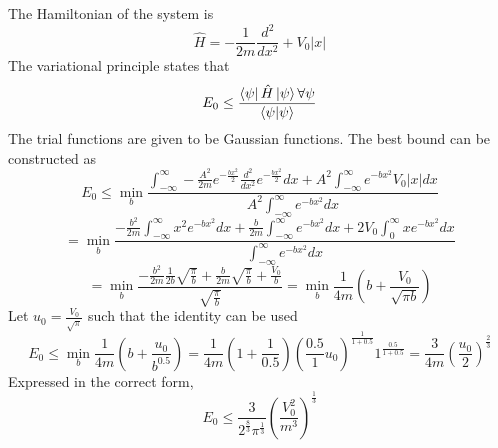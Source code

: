 \begin{sol}
The Hamiltonian of the system is 
\begin{equation}
	\hat H=-\frac{1}{2m}\frac{d^2}{dx^2}+V_0|x|
\end{equation}
The variational principle states that
\begin{equation}
	E_0\leq\frac{\bra\psi\hat H\ket\psi\forall\psi}{\braket{\psi}{\psi}}
\end{equation}
The trial functions are given to be Gaussian functions. The best bound can be constructed as
\begin{equation}
	E_0\leq\min_{b}\frac{\int_{-\infty}^\infty -\frac{A^2}{2m}e^{-\frac{bx^2}{2}}\frac{d^2}{dx^2}e^{-\frac{bx^2}{2}}dx+A^2\int_{-\infty}^\infty e^{-bx^2}V_0|x|dx}{A^2\int_{-\infty}^\infty e^{-bx^2}dx}
\end{equation}
\begin{equation}
	=\min_b\frac{-\frac{b^2}{2m}\int_{-\infty}^\infty x^2e^{-bx^2}dx+\frac{b}{2m}\int_{-\infty}^\infty e^{-bx^2}dx+2V_0\int_0^\infty xe^{-bx^2}dx}{\int_{-\infty}^\infty e^{-bx^2}dx}
\end{equation}
\begin{equation}
	=\min_b\frac{-\frac{b^2}{2m}\frac{1}{2b}\sqrt{\frac{\pi}{b}}+\frac{b}{2m}\sqrt{\frac{\pi}{b}}+\frac{V_0}{b}}{\sqrt{\frac{\pi}{b}}}=\min_b \frac{1}{4m}\left(b+\frac{V_0}{\sqrt{\pi b}}\right)
\end{equation}
Let $u_0=\frac{V_0}{\sqrt{\pi}}$ such that the identity can be used
\begin{equation}
	E_0\leq\min_b\frac{1}{4m}\left(b+\frac{u_0}{b^{0.5}}\right)=\frac{1}{4m}(1+\frac{1}{0.5})(\frac{0.5}{1}u_0)^{\frac{1}{1+0.5}}1^{\frac{0.5}{1+0.5}}=\frac{3}{4m}\left(\frac{u_0}{2}\right)^\frac{2}{3}
\end{equation}
Expressed in the correct form,
\begin{equation}
	E_0\leq \frac{3}{2^\frac{8}{3}\pi^\frac{1}{3}}\left(\frac{V_0^2}{m^3}\right)^\frac{1}{3}
\end{equation}
\end{sol}